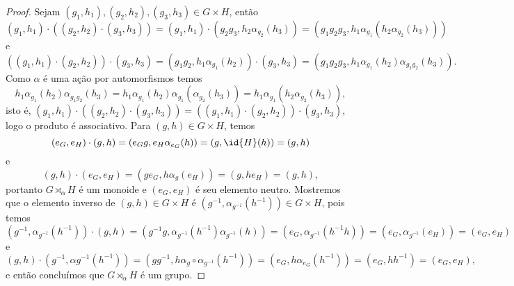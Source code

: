 \begin{proof}
    Sejam \( (g_1, h_1), (g_2, h_2), (g_3, h_3) \in G \times H\), então
    \begin{equation*}
        (g_1, h_1) \cdot \left((g_2, h_2)\cdot (g_3,h_3)\right) = (g_1,h_1) \cdot \left(g_2g_3, h_2 \alpha_{g_2}(h_3)\right) = \left(g_1 g_2 g_3, h_1 \alpha_{g_1}( h_2 \alpha_{g_2}(h_3))\right)
    \end{equation*}
    e
    \begin{equation*}
        \left((g_1, h_1)\cdot (g_2,h_2)\right) \cdot  (g_3, h_3) = \left(g_1 g_2, h_1 \alpha_{g_1}(h_2)\right) \cdot (g_3, h_3) = \left(g_1 g_2 g_3, h_1 \alpha_{g_1}(h_2) \alpha_{g_1 g_2}(h_3)\right).
    \end{equation*}
    Como \(\alpha\) é uma ação por automorfismos temos
    \begin{equation*}
        h_1 \alpha_{g_1}(h_2)\alpha_{g_1 g_2}(h_3) = h_1 \alpha_{g_1}(h_2) \alpha_{g_1}\left(\alpha_{g_2} (h_3)\right) = h_1 \alpha_{g_1}\left(h_2 \alpha_{g_2}(h_3)\right),
    \end{equation*}
    isto é, \((g_1, h_1) \cdot \left((g_2, h_2)\cdot (g_3,h_3)\right) =\left((g_1, h_1)\cdot (g_2,h_2)\right) \cdot  (g_3, h_3)\), logo o produto é associativo. Para \((g, h) \in G \times H\), temos
    \begin{equation*}
        (e_G, e_H)\cdot (g, h) = (e_Gg, e_H \alpha_{e_G}(h)) = \left(g, \id{H}(h)\right) = (g, h)
    \end{equation*}
    e
    \begin{equation*}
        (g,h)\cdot (e_G, e_H) = (g e_G, h \alpha_{g}(e_H)) = (g, h e_H) = (g,h),
    \end{equation*}
    portanto \(G \rtimes_{\alpha} H\) é um monoide e \((e_G, e_H)\) é seu elemento neutro. Mostremos que o elemento inverso de \((g, h) \in G \times H\) é \(\left(g^{-1}, \alpha_{g^{-1}}(h^{-1})\right) \in G \times H\), pois temos
    \begin{equation*}
        \left(g^{-1}, \alpha_{g^{-1}}(h^{-1})\right)\cdot(g, h) = \left(g^{-1}g, \alpha_{g^{-1}}(h^{-1}) \alpha_{g^{-1}}(h)\right) = \left(e_G, \alpha_{g^{-1}}(h^{-1} h)\right) = \left(e_G, \alpha_{g^{-1}}(e_H)\right) = (e_G, e_H)
    \end{equation*}
    e
    \begin{equation*}
        (g, h) \cdot \left(g^{-1}, \alpha{g^{-1}}(h^{-1})\right) = \left(gg^{-1}, h \alpha_{g}\circ \alpha_{g^{-1}}(h^{-1})\right) = \left(e_G, h \alpha_{e_G}(h^{-1})\right) = (e_G, h h^{-1}) = (e_G, e_H),
    \end{equation*}
    e então concluímos que \(G \rtimes_{\alpha} H\) é um grupo.
\end{proof}
